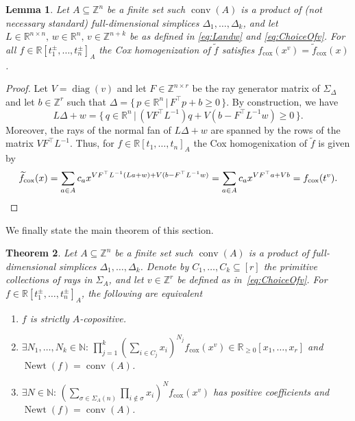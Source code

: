\documentclass[a4paper,11pt]{amsart}
\newtheorem{theorem}{Theorem}[section]
\newtheorem{lemma}[theorem]{Lemma}
\theoremstyle{definition}
\DeclareMathOperator{\conv}{conv}
\DeclareMathOperator{\diag}{diag}
\DeclareMathOperator{\Newt}{Newt}
\newcommand{\ZZ}{\mathbb{Z}}
\newcommand{\NN}{\mathbb{N}}
\newcommand{\RR}{\mathbb{R}}
\newcommand{\cox}{\mathrm{cox}}
\begin{document}
\begin{lemma}
\label{Lemma:CoordChange}
Let $A \subseteq \ZZ^n$ be a finite set such $\conv(A)$ is a product of (not necessary standard) full-dimensional simplices $\Delta_1, \dots , \Delta_k$, and let $L \in \mathbb{R}^{n\times n},\, w \in \RR^n,\, v \in \ZZ^{n+k}$ be as defined in \eqref{eq:Landw} and \eqref{eq:ChoiceOfv}.
For all $f \in \RR[t_1^\pm, \dots, t_n^\pm]_A$ the Cox homogenization of $\widetilde{f}$ satisfies $f_\cox(x^v) = \widetilde{f}_\cox(x)$.
\end{lemma}

\begin{proof}
   Let $V = \diag(v)$ and let $F \in \ZZ^{n \times r}$ be the ray generator matrix of $\Sigma_\Delta$ and let $b \in \ZZ^r$ such that $\Delta = \{ \, p \in \RR^n \, | \, F^\top p + b \geq 0 \, \}$.
    By construction, we have
    \[L \Delta + w  = \{ \, q \in \RR^n \, | \, (V F^\top L^{-1}) q + V(b - F^\top L^{-1}w) \geq 0 \, \}.\]
    Moreover, the rays of the normal fan of $L\Delta + w$ are spanned by the rows of the matrix $V F^\top L^{-1}$. 
    Thus, for $f \in \RR[t_1,\dots,t_n]_A$ the Cox homogenixation of $\widetilde{f}$ is given by
    \begin{equation*}
        \widetilde{f}_\cox(x) = \sum_{a \in A} c_a x^{V F^\top L^{-1}(La+w) + V(b - F^\top L^{-1}w)} = \sum_{a \in A} c_a x^{V F^\top a  + V b} = f_\cox(t^v).  \hfill\qedhere
    \end{equation*}
\end{proof}
\bigskip


We finally state the main theorem of this section. 


\begin{theorem}
\label{thm:polyaInCox}
Let $A \subseteq \ZZ^n$ be a finite set such $\conv(A)$ is a product of full-dimensional simplices $\Delta_1, \dots , \Delta_k$. Denote by $C_1,\dots,C_k \subseteq [r]$ the primitive collections of rays in $\Sigma_A$, and let $v \in \mathbb{Z}^r$ be defined as in~\eqref{eq:ChoiceOfv}. For $f\in \RR[t_1^{\pm},\ldots,t_n^{\pm}]_A$, the following are equivalent
\begin{enumerate}
    \item[(i)] $f$ is strictly $A$-copositive.
    \item[(ii)]  $\exists N_1,\ldots,N_k\in \NN\colon\,\prod_{j=1}^k\left(\sum_{i\in C_j} x_i \right)^{N_j }f_\cox(x^v) \in \RR_{\geq0}[x_1,\dots,x_r]$  and $\Newt(f) = \conv(A)$.
    \item[(iii)] $\exists N\in \NN\colon \, \left(  \sum_{\sigma \in \Sigma_A(n)} \prod_{i \notin \sigma} x_i  \right)^N f_\cox(x^v)$ has positive coefficients and $\Newt(f) = \conv(A)$.
\end{enumerate}
\end{theorem}
\end{document}

